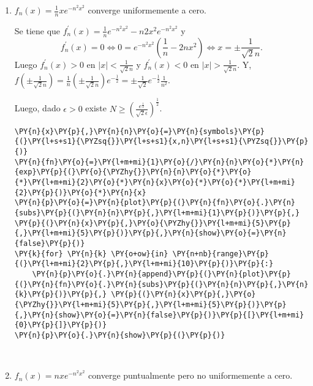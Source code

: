 \begin{ejemplo}{}
\begin{enumerate}
\item
$f_n(x)=\frac{1}{n}xe^{-n^2x^2}$ converge uniformemente a cero. 

Se tiene que 
$f^{'}_n(x)=\frac{1}{n}e^{-n^2x^2}-n2x^2 e^{-n^2x^2}$ y 
\[f^{'}_n(x)=0 \Longleftrightarrow 0=e^{-n^2x^2}\left(\frac{1}{n}-2nx^2\right) \Leftrightarrow x=\pm\frac{1}{\sqrt{2}n}.\]
Luego $f^{'}_n(x)>0$ en $|x|<\frac{1}{\sqrt{2}n}$ y $f^{'}_n(x)<0$ en $|x|>\frac{1}{\sqrt{2}n}$.
Y, $f\left(\pm\frac{1}{\sqrt{2}n}\right)=\frac{1}{n}(\pm\frac{1}{\sqrt{2}n} )e^{-\frac{1}{2}}=
\pm \frac{1}{\sqrt{2}}e^{-\frac{1}{2}} \frac{1}{n^2}.$

Luego, dado $\epsilon>0$ existe $N\geq \left(\frac{e^{\frac{1}{2}}}{\sqrt{2}\epsilon}\right)^{\frac{1}{2}}$.

    \begin{tcolorbox}[breakable, size=fbox, boxrule=1pt, pad at break*=1mm,colback=cellbackground, colframe=cellborder]
\begin{Verbatim}[commandchars=\\\{\}]
\PY{n}{x}\PY{p}{,}\PY{n}{n}\PY{o}{=}\PY{n}{symbols}\PY{p}{(}\PY{l+s+s1}{\PYZsq{}}\PY{l+s+s1}{x,n}\PY{l+s+s1}{\PYZsq{}}\PY{p}{)}
\PY{n}{fn}\PY{o}{=}\PY{l+m+mi}{1}\PY{o}{/}\PY{n}{n}\PY{o}{*}\PY{n}{exp}\PY{p}{(}\PY{o}{\PYZhy{}}\PY{n}{n}\PY{o}{*}\PY{o}{*}\PY{l+m+mi}{2}\PY{o}{*}\PY{n}{x}\PY{o}{*}\PY{o}{*}\PY{l+m+mi}{2}\PY{p}{)}\PY{o}{*}\PY{n}{x}
\PY{n}{p}\PY{o}{=}\PY{n}{plot}\PY{p}{(}\PY{n}{fn}\PY{o}{.}\PY{n}{subs}\PY{p}{(}\PY{n}{n}\PY{p}{,}\PY{l+m+mi}{1}\PY{p}{)}\PY{p}{,} \PY{p}{(}\PY{n}{x}\PY{p}{,}\PY{o}{\PYZhy{}}\PY{l+m+mi}{5}\PY{p}{,}\PY{l+m+mi}{5}\PY{p}{)}\PY{p}{,}\PY{n}{show}\PY{o}{=}\PY{n}{false}\PY{p}{)}
\PY{k}{for} \PY{n}{k} \PY{o+ow}{in} \PY{n+nb}{range}\PY{p}{(}\PY{l+m+mi}{2}\PY{p}{,}\PY{l+m+mi}{10}\PY{p}{)}\PY{p}{:}
    \PY{n}{p}\PY{o}{.}\PY{n}{append}\PY{p}{(}\PY{n}{plot}\PY{p}{(}\PY{n}{fn}\PY{o}{.}\PY{n}{subs}\PY{p}{(}\PY{n}{n}\PY{p}{,}\PY{n}{k}\PY{p}{)}\PY{p}{,} \PY{p}{(}\PY{n}{x}\PY{p}{,}\PY{o}{\PYZhy{}}\PY{l+m+mi}{5}\PY{p}{,}\PY{l+m+mi}{5}\PY{p}{)}\PY{p}{,}\PY{n}{show}\PY{o}{=}\PY{n}{false}\PY{p}{)}\PY{p}{[}\PY{l+m+mi}{0}\PY{p}{]}\PY{p}{)}
\PY{n}{p}\PY{o}{.}\PY{n}{show}\PY{p}{(}\PY{p}{)}
\end{Verbatim}
\end{tcolorbox}

    \begin{center}
    \end{center}
    { \hspace*{\fill} \\}
\item $f_n(x)=nxe^{-n^2x^2}$ converge puntualmente pero no uniformemente a cero.


\end{enumerate}
\end{ejemplo}
